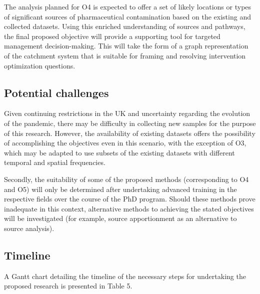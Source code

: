 \documentclass{article}
\begin{document}
The analysis planned for O4 is expected to offer a set of likely locations or types of significant sources of pharmaceutical contamination based on the existing and collected datasets. Using this enriched understanding of sources and pathways, the final proposed objective will provide a supporting tool for targeted management decision-making. This will take the form of a graph representation of the catchment system that is suitable for framing and resolving intervention optimization questions.

\subsection{Potential challenges}
Given continuing restrictions in the UK and uncertainty regarding the evolution of the pandemic, there may be difficulty in collecting new samples for the purpose of this research. However, the availability of existing datasets offers the possibility of accomplishing the objectives even in this scenario, with the exception of O3, which may be adapted to use subsets of the existing datasets with different temporal and spatial frequencies.

Secondly, the suitability of some of the proposed methods (corresponding to O4 and O5) will only be determined after undertaking advanced training in the respective fields over the course of the PhD program. Should these methods prove inadequate in this context, alternative methods to achieving the stated objectives will be investigated (for example, source apportionment \citep{Gasperi2010ContributionsSystems,Giglioli2020SourceNaples} as an alternative to source analysis).

\subsection{Timeline}
 A Gantt chart detailing the timeline of the necessary steps for undertaking the proposed research is presented in Table 5.
 
\end{document}
